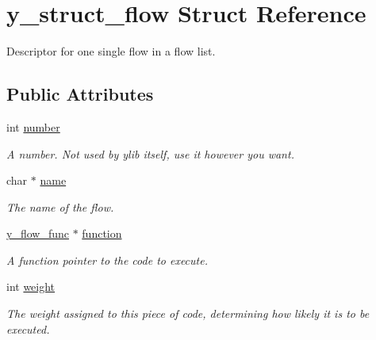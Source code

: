 \hypertarget{structy__struct__flow}{\section{y\-\_\-struct\-\_\-flow Struct Reference}
\label{structy__struct__flow}
}


Descriptor for one single flow in a flow list.  


\subsection*{Public Attributes}
\begin{DoxyCompactItemize}
\item 
\hypertarget{structy__struct__flow_ae41d27d59268dd262885785904ee47ab}{int \hyperlink{structy__struct__flow_ae41d27d59268dd262885785904ee47ab}{number}}\label{structy__struct__flow_ae41d27d59268dd262885785904ee47ab}

\begin{DoxyCompactList}\small\item\em A number. Not used by ylib itself, use it however you want. \end{DoxyCompactList}\item 
\hypertarget{structy__struct__flow_a71ebba116c39d3a04968c4e4982cdee9}{char $\ast$ \hyperlink{structy__struct__flow_a71ebba116c39d3a04968c4e4982cdee9}{name}}\label{structy__struct__flow_a71ebba116c39d3a04968c4e4982cdee9}

\begin{DoxyCompactList}\small\item\em The name of the flow. \end{DoxyCompactList}\item 
\hypertarget{structy__struct__flow_a76183e110229c34cd1e52803b34e192c}{\hyperlink{y__flow__list_8c_a01580762036bdc8332d4dcf0df9dffc4}{y\-\_\-flow\-\_\-func} $\ast$ \hyperlink{structy__struct__flow_a76183e110229c34cd1e52803b34e192c}{function}}\label{structy__struct__flow_a76183e110229c34cd1e52803b34e192c}

\begin{DoxyCompactList}\small\item\em A function pointer to the code to execute. \end{DoxyCompactList}\item 
\hypertarget{structy__struct__flow_aaba3104385529e46107d8b37448281bd}{int \hyperlink{structy__struct__flow_aaba3104385529e46107d8b37448281bd}{weight}}\label{structy__struct__flow_aaba3104385529e46107d8b37448281bd}

\begin{DoxyCompactList}\small\item\em The weight assigned to this piece of code, determining how likely it is to be executed. \end{DoxyCompactList}\end{DoxyCompactItemize}


